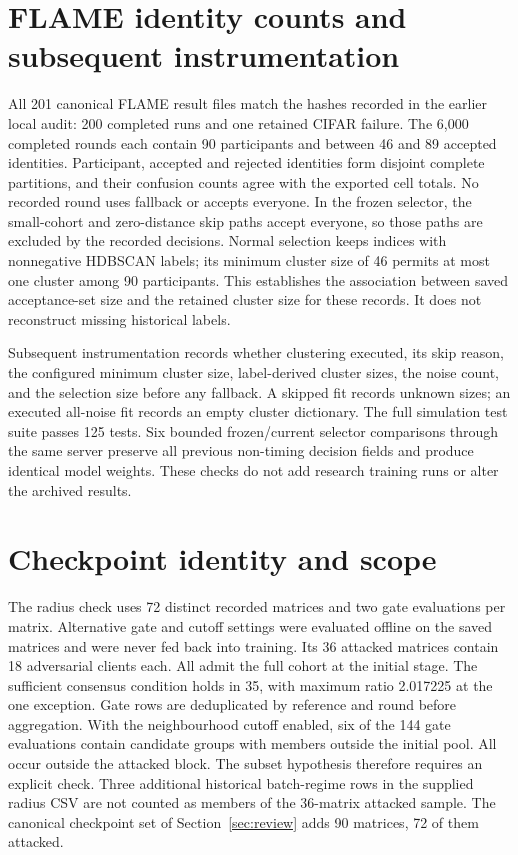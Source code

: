 \documentclass[journal]{IEEEtran}
\begin{document}
\section{FLAME identity counts and subsequent instrumentation}
All 201 canonical FLAME result files match the hashes recorded in the earlier local audit: 200 completed runs and one retained CIFAR failure. The 6,000 completed rounds each contain 90 participants and between 46 and 89 accepted identities. Participant, accepted and rejected identities form disjoint complete partitions, and their confusion counts agree with the exported cell totals. No recorded round uses fallback or accepts everyone. In the frozen selector, the small-cohort and zero-distance skip paths accept everyone, so those paths are excluded by the recorded decisions. Normal selection keeps indices with nonnegative HDBSCAN labels; its minimum cluster size of 46 permits at most one cluster among 90 participants. This establishes the association between saved acceptance-set size and the retained cluster size for these records. It does not reconstruct missing historical labels.

Subsequent instrumentation records whether clustering executed, its skip reason, the configured minimum cluster size, label-derived cluster sizes, the noise count, and the selection size before any fallback. A skipped fit records unknown sizes; an executed all-noise fit records an empty cluster dictionary. The full simulation test suite passes 125 tests. Six bounded frozen/current selector comparisons through the same server preserve all previous non-timing decision fields and produce identical model weights. These checks do not add research training runs or alter the archived results.

\section{Checkpoint identity and scope}
The radius check uses 72 distinct recorded matrices and two gate evaluations per matrix. Alternative gate and cutoff settings were evaluated offline on the saved matrices and were never fed back into training. Its 36 attacked matrices contain 18 adversarial clients each. All admit the full cohort at the initial stage. The sufficient consensus condition holds in 35, with maximum ratio 2.017225 at the one exception. Gate rows are deduplicated by reference and round before aggregation. With the neighbourhood cutoff enabled, six of the 144 gate evaluations contain candidate groups with members outside the initial pool. All occur outside the attacked block. The subset hypothesis therefore requires an explicit check. Three additional historical batch-regime rows in the supplied radius CSV are not counted as members of the 36-matrix attacked sample. The canonical checkpoint set of Section~\ref{sec:review} adds 90 matrices, 72 of them attacked.
\end{document}
